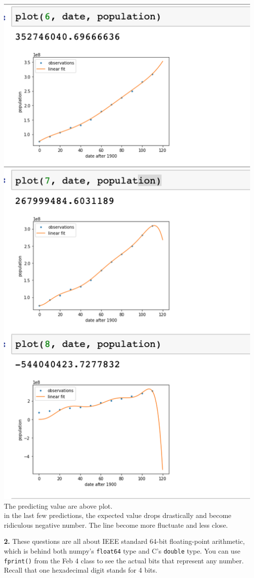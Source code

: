 \documentclass[11pt]{article}
\begin{document}
\includegraphics[scale = 0.7]{h51e2}\\
The predicting value are above plot.\\ in the last few predictions, the expected value drops drastically and become ridiculous negative number. The line become more fluctuate and less close.
\par\bigskip
\newpage
{\bf 2.}
These questions are all about IEEE standard 64-bit floating-point arithmetic,
which is behind both numpy's {\tt float64} type and C's {\tt double} type.
You can use {\tt fprint()} from the Feb 4 class to see
the actual bits that represent any number.
Recall that one hexadecimal digit stands for 4 bits.
\end{document}

